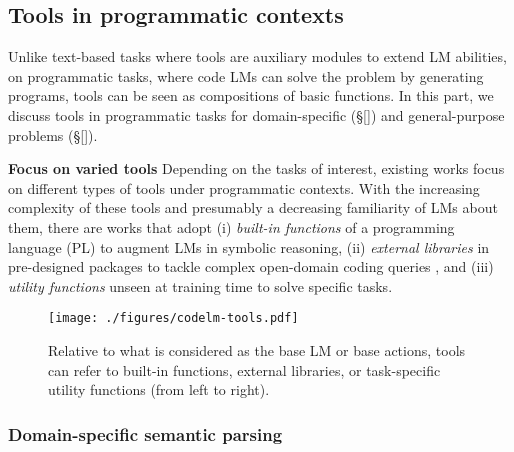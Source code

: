 \subsection{Tools in programmatic contexts}
\label{sub:tools-and-programs}

Unlike text-based tasks where tools are auxiliary modules to extend LM abilities, on programmatic tasks, where code LMs can solve the problem by generating programs, tools can be seen as compositions of basic functions.
In this part, we discuss tools in programmatic tasks for domain-specific (\S\ref{}) and general-purpose problems (\S\ref{}).


\noindent \textbf{Focus on varied tools} \quad
Depending on the tasks of interest, existing works focus on different types of tools under programmatic contexts. With the increasing complexity of these tools and presumably a decreasing familiarity of LMs about them, there are works that adopt (i) \textcolor{candypink}{\textit{built-in functions}} of a programming language (PL) to augment LMs in symbolic reasoning, (ii) \textcolor{ao!80}{\textit{external libraries}} in pre-designed packages to tackle complex open-domain coding queries \citep{wang2023execution}, and (iii) \textcolor{blue(ncs)}{\textit{utility functions}} unseen at training time to solve specific tasks.

\begin{figure}[ht]
\centering
\vspace{-1mm}
    \texttt{[image: ./figures/codelm-tools.pdf]}
\vspace{-6mm}
\caption{Relative to what is considered as the base LM or base actions, tools can refer to built-in functions, external libraries, or task-specific utility functions (from left to right).}
\vspace{-1mm}
\label{fig:codelm-tools}
\end{figure}



\subsubsection{Domain-specific semantic parsing}
\label{sub:domain-spec}

